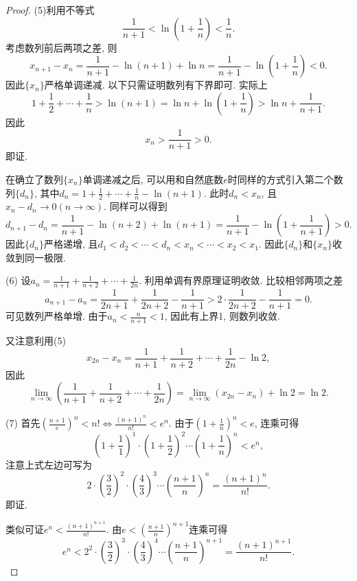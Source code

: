 \documentclass[UTF8,11pt, a4paper, oneside, fontset=none]{ctexbook}
\begin{document}
\begin{itemize}
\begin{proof}
(5)利用不等式
\[
\frac{1}{n+1} < \ln(1 + \frac{1}{n}) < \frac{1}{n}.
\]
考虑数列前后两项之差, 则
\[
x_{n+1} - x_n  = \frac{1}{n+1} - \ln(n+1) + \ln n = \frac{1}{n+1} - \ln \left( 1 + \frac{1}{n} \right) < 0.
\]
因此$\{x_n\}$严格单调递减. 以下只需证明数列有下界即可. 实际上
\[
1 + \frac{1}{2} + \cdots + \frac{1}{n} > \ln(n+1) = \ln n + \ln  \left( 1 + \frac{1}{n} \right) > \ln n + \frac{1}{n+1}.
\]
因此
\[
x_n > \frac{1}{n+1} >0.
\]
即证.


在确立了数列$\{ x_n \}$单调递减之后, 可以用和自然底数$e$时同样的方式引入第二个数列$\{d_n\}$, 其中$d_n = 1 + \frac{1}{2} + \cdots + \frac{1}{n} - \ln(n+1)$. 此时$d_n < x_n$, 且$x_n - d_n \to 0 (n \to \infty)$. 同样可以得到
\[
d_{n+1} - d_n = \frac{1}{n+1} - \ln(n+2) + \ln(n+1) = \frac{1}{n+1} - \ln \left( 1 + \frac{1}{n+1} \right) >0.
\]
因此$\{d_n\}$严格递增, 且$d_1 < d_2 < \cdots < d_n < x_n < \cdots < x_2 < x_1$. 因此$\{d_n\}$和$\{x_n\}$收敛到同一极限.

(6) 设$a_n = \frac{1}{n+1} + \frac{1}{n+2} + \cdots + \frac{1}{2n}$. 利用单调有界原理证明收敛. 比较相邻两项之差
\[
a_{n+1} - a_n =\frac{1}{2n+1} + \frac{1}{2n+2} - \frac{1}{n+1} >  2 \cdot \frac{1}{2n+2} - \frac{1}{n+1} =0.
\]
可见数列严格单增. 由于$a_n < \frac{n}{n+1} <1$, 因此有上界1, 则数列收敛.


又注意利用(5)
\[
x_{2n} - x_n =  \frac{1}{n+1} + \frac{1}{n+2} + \cdots + \frac{1}{2n} - \ln 2,
\]
因此
\[
\lim_{n \to \infty} \left(  \frac{1}{n+1} + \frac{1}{n+2} + \cdots + \frac{1}{2n} \right) = \lim_{n \to \infty}(x_{2n} - x_n) + \ln 2 = \ln 2.
\]


(7) 首先$\left( \frac{n+1}{e} \right)^n < n!  \Leftrightarrow \frac{(n+1)^n}{n!} < e^n$. 由于$\left(1+ \frac{1}{n} \right)^n <e$, 连乘可得
\[
\left(1+ \frac{1}{1} \right)^1 \cdot \left(1+ \frac{1}{2} \right)^2 \cdots \left(1+ \frac{1}{n} \right)^n < e^n,
\]
注意上式左边可写为
\[
2 \cdot (\frac{3}{2})^2 \cdot (\frac{4}{3})^3 \cdots (\frac{n+1}{n})^n =  \frac{(n+1)^n}{n!}.
\]
即证.


类似可证$e^n < \frac{(n+1)^{n+1}}{n!}$. 由$e < (\frac{n+1}{n})^{n+1}$连乘可得
\[
e^n < 2^2 \cdot (\frac{3}{2})^3 \cdot (\frac{4}{3})^4 \cdots (\frac{n+1}{n})^{n+1} = \frac{(n+1)^{n+1}}{n!}.
\]



\end{proof}



\end{itemize}

\clearpage
\end{document}
